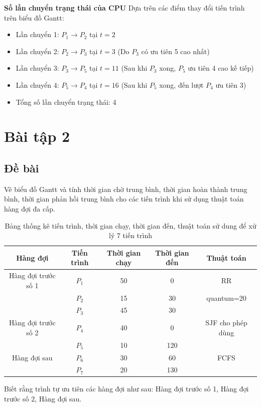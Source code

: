 \documentclass[12pt, letterpaper]{article}
\begin{document}
\textbf{Số lần chuyển trạng thái của CPU}
Dựa trên các điểm thay đổi tiến trình trên biểu đồ Gantt:
\begin{itemize}
    \item Lần chuyển 1: $P_1 \rightarrow P_2$ tại $t=2$
    \item Lần chuyển 2: $P_2 \rightarrow P_3$ tại $t=3$ (Do $P_3$ có ưu tiên 5 cao nhất)
    \item Lần chuyển 3: $P_3 \rightarrow P_5$ tại $t=11$ (Sau khi $P_3$ xong, $P_5$ ưu tiên 4 cao kế tiếp)
    \item Lần chuyển 4: $P_5 \rightarrow P_4$ tại $t=16$ (Sau khi $P_5$ xong, đến lượt $P_4$ ưu tiên 3)
    \item Tổng số lần chuyển trạng thái: 4
\end{itemize}
\section{Bài tập 2}
\subsection{Đề bài}
Vẽ biểu đồ Gantt và tính thời gian chờ trung bình, thời gian hoàn thành trung bình, thời gian
phản hồi trung bình cho các tiến trình khi sử dụng thuật toán hàng đợi đa cấp.
\begin{table}[H]
    \centering
    \caption{Bảng thống kê tiến trình, thời gian chạy, thời gian đến, thuật toán sử dung để xử lý 7 tiến trình}
    \begin{tabular}{|c|c|c|c|c|}
        \hline
        \textbf{Hàng đợi} & \textbf{Tiến trình} & \textbf{Thời gian chạy} & \textbf{Thời gian đến} & \textbf{Thuật toán} \\
        \hline
        Hàng đợi trước số 1 & $P_{1}$ & 50 & 0 & RR \\
        & $P_{2}$ & 15 & 30 & quantum=20 \\
        & $P_{3}$ & 45 & 30 & \\
        \hline
        Hàng đợi trước số 2 & $P_{4}$ & 40 & 0 & SJF cho phép dùng \\
        & $P_{5}$ & 10 & 120 & \\
        \hline
        Hàng đợi sau & $P_{6}$ & 30 & 60 & FCFS \\
        & $P_{7}$ & 20 & 130 & \\
        \hline
    \end{tabular}
\end{table}
\noindent Biết rằng trình tự ưu tiên các hàng đợi như sau: Hàng đợi trước số 1, Hàng đợi trước số 2,
Hàng đợi sau.
\end{document}
